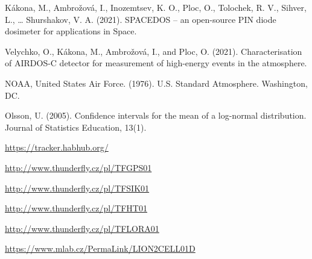 \documentclass{Rpd}
\begin{document}
\begin{thebibliography}{99.}
 Kákona, M., Ambrožová, I., Inozemtsev, K. O., Ploc, O., Tolochek, R. V., Sihver, L., … Shurshakov, V. A. (2021). SPACEDOS – an open-source PIN diode dosimeter for applications in Space.

 Velychko, O., Kákona, M., Ambrožová, I., and Ploc, O. (2021). Characterisation of AIRDOS-C detector for measurement of high-energy events in the atmosphere.

 NOAA, United States Air Force. (1976). U.S. Standard Atmosphere. Washington, DC.

 Olsson, U. (2005). Confidence intervals for the mean of a log-normal distribution. Journal of Statistics Education, 13(1).

 \url{https://tracker.habhub.org/}

 \url{http://www.thunderfly.cz/pl/TFGPS01}

 \url{http://www.thunderfly.cz/pl/TFSIK01}

 \url{http://www.thunderfly.cz/pl/TFHT01}

 \url{http://www.thunderfly.cz/pl/TFLORA01}

 \url{https://www.mlab.cz/PermaLink/LION2CELL01D}



\end{thebibliography}
\end{document}
